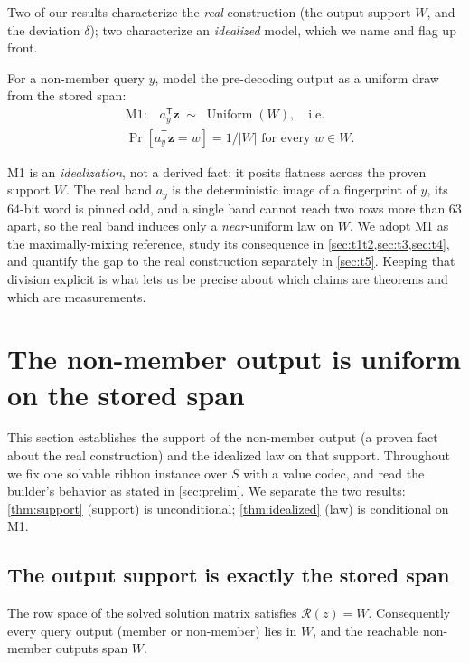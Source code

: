 \documentclass[sigconf,nonacm,anonymous,balance=false]{acmart}
\DeclareMathOperator{\Uniform}{Uniform}
\newcommand{\W}{W}                          %
\newcommand{\Rz}{\mathcal{R}(z)}            %
\newcommand{\bz}{\mathbf{z}}                %
\newcommand{\ay}{a_y}                       %
\begin{document}
Two of our results characterize the \emph{real} construction (the output support
$\W$, and the deviation $\delta$); two characterize an \emph{idealized} model, which
we name and flag up front.
\begin{definition}
\label{def:M1}
For a non-member query $y$, model the pre-decoding output as a uniform draw from the
stored span:
\[
  \begin{aligned}
  &\text{M1:}\quad \ay^{\mathsf T}\bz \;\sim\; \Uniform(\W),
  \quad\text{i.e.}\\
  &\Pr[\ay^{\mathsf T}\bz = w] = 1/|\W| \text{ for every } w \in \W.
  \end{aligned}
\]
\end{definition}
M1 is an \emph{idealization}, not a derived fact: it posits flatness across the
proven support $\W$. The real band $\ay$ is the deterministic image of a fingerprint
of $y$, its $64$-bit word is pinned odd, and a single band cannot reach two rows more
than $63$ apart, so the real band induces only a \emph{near}-uniform law on $\W$.
We adopt M1 as the maximally-mixing reference, study its consequence in
\cref{sec:t1t2,sec:t3,sec:t4}, and quantify the gap to the real construction
separately in \cref{sec:t5}. Keeping that division explicit is what lets us be precise
about which claims are theorems and which are measurements.

\section{The non-member output is uniform on the stored span}
\label{sec:t1t2}

This section establishes the support of the non-member output (a proven fact about
the real construction) and the idealized law on that support. Throughout we fix one
solvable ribbon instance over $S$ with a value codec, and read the builder's behavior
as stated in \cref{sec:prelim}. We separate the two results: \cref{thm:support}
(support) is unconditional; \cref{thm:idealized} (law) is conditional on M1.

\subsection{The output support is exactly the stored span}

\begin{theorem}
\label{thm:support}
The row space of the solved solution matrix satisfies $\Rz = \W$. Consequently every
query output (member or non-member) lies in $\W$, and the reachable non-member outputs
span $\W$.
\end{theorem}
\end{document}
